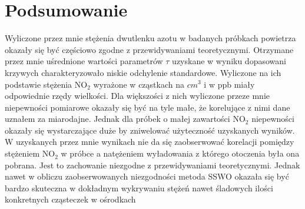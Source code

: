 \documentclass[10pt,a4paper]{article}
\begin{document}
\section*{Podsumowanie}
Wyliczone przez mnie stężenia dwutlenku azotu w badanych próbkach powietrza okazały się być częściowo zgodne z przewidywaniami teoretycznymi. Otrzymane przez mnie uśrednione wartości parametrów $\tau$ uzyskane w wyniku dopasowani krzywych charakteryzowało niskie odchylenie standardowe. Wyliczone na ich podstawie stężenia $\text{NO}_{\text{2}}$ wyrażone w cząstkach na $cm^3$ i w ppb miały odpowiednie rzędy wielkości. Dla większości z nich wyliczone przeze mnie niepewności pomiarowe okazały się być na tyle małe, że korelujące z nimi dane uznałem za miarodajne. Jednak dla próbek o małej zawartości $\text{NO}_{\text{2}}$ niepewności okazały się wystarczające duże by zniwelować użyteczność uzyskanych wyników. W uzyskanych przez mnie wynikach nie da się zaobserwować korelacji pomiędzy stężeniem $\text{NO}_{\text{2}}$ w próbce a natężeniem wyładowania z którego otoczenia była ona pobrana. Jest to zachowanie niezgodne z przewidywaniami teoretycznymi. Jednak nawet w obliczu zaobserwowanych niezgodności metoda SSWO okazała się być bardzo skuteczna w dokładnym wykrywaniu stężeń nawet śladowych ilości konkretnych cząsteczek w ośrodkach

\newpage


\end{document}

